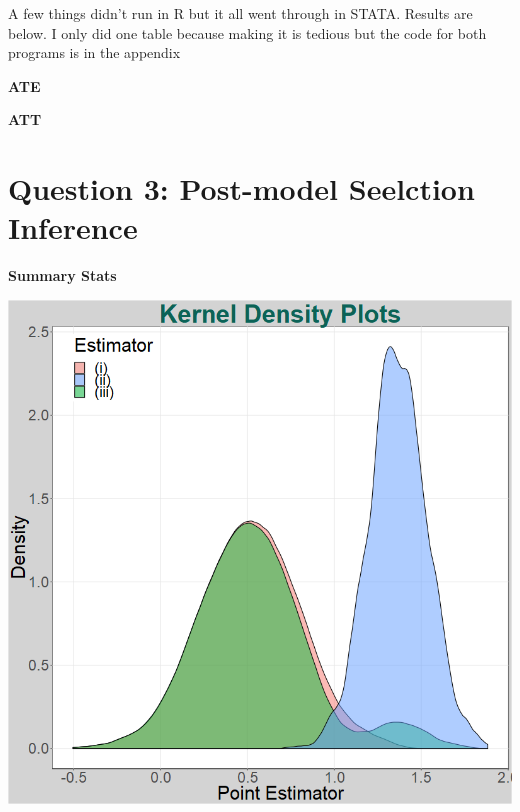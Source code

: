 \documentclass[11pt]{article}
\begin{document}
A few things didn't run in R but it all went through in STATA. Results are below. I only did one table because making it is tedious but the code for both programs is in the appendix 

\begin{center}
	
			\centering
	
	\textbf{ATE}\par\medskip
	\scalebox{0.85}{
	
}
\end{center}

\newpage

\begin{center}
	
	\centering
	
	\textbf{ATT}\par\medskip
	\scalebox{0.85}{
		
	}
\end{center}



\section{Question 3: Post-model Seelction Inference}


\begin{center}
	
	\centering
	
	\textbf{Summary Stats}\par\medskip
	\scalebox{0.85}{
		
	}
\end{center}

\begin{center}
	\includegraphics[width=.8\linewidth]{q4_den.png}
	
\end{center}
\end{document}
